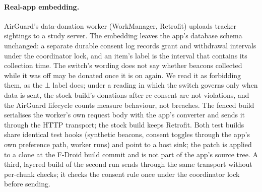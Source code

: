 \paragraph{Real-app embedding.} AirGuard's data-donation worker (WorkManager, Retrofit) uploads tracker sightings to a
study server. The embedding leaves the app's database schema unchanged: a separate durable consent log records grant and
withdrawal intervals under the coordinator lock, and an item's label is the interval that contains its collection time.
The switch's wording does not say whether beacons collected while it was off may be donated once it is on again. We read
it as forbidding them, as the $\bot$ label does; under a reading in which the switch governs only when data is sent, the
stock build's donations after re-consent are not violations, and the AirGuard lifecycle counts measure behaviour, not
breaches.
The fenced build serialises the worker's own request body with the app's converter and sends it through the HTTP
transport; the stock build keeps Retrofit. Both test builds share identical test hooks (synthetic beacons, consent
toggles through the app's own preference path, worker runs) and point to a host sink; the patch is applied to a clone at
the F-Droid build commit and is not part of the app's source tree. A third, layered build of the second run sends through
the same transport without per-chunk checks; it checks the consent rule once under the coordinator lock before sending.

